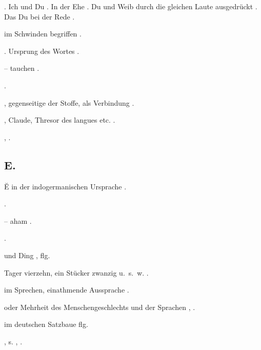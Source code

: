 \begin{register}
. Ich und Du \pageref{sp.2}. In der Ehe \pageref{sp.306}. Du und Weib durch die gleichen Laute ausgedrückt \pageref{sp.306}. Das Du bei der Rede \pageref{sp.318}.

 im Schwinden begriffen \pageref{sp.254}\sed{, \pageref{sp.393}}.

. Ursprung des Wortes \pageref{sp.41}.


 – tauchen \pageref{sp.267}.

 \pageref{sp.165}.

, gegenseitige der Stoffe, als Verbindung \pageref{sp.324}.

, Claude, Thresor des langues etc. \pageref{sp.27}.

 \pageref{sp.114}, \pageref{sp.359}.

\subsection*{E.}\label{reg.E}

Ĕ in der indogermanischen Ursprache \pageref{sp.186}.

 \pageref{sp.282}.


 – aham \pageref{sp.214}.

 \pageref{sp.107}.

 und Ding \pageref{sp.381}, \pageref{sp.453} flg.

 Tager vierzehn, ein Stücker zwanzig u.~s.~w. \pageref{sp.60}.

 im Sprechen, einathmende Aussprache \pageref{sp.225}.



 oder Mehrheit des Menschengeschlechts und der Sprachen \sed{\pageref{sp.62},} \pageref{sp.143}, \pageref{sp.395}.

 im deutschen Satzbaue \pageref{sp.468} flg.


, s. , .


\end{register}
